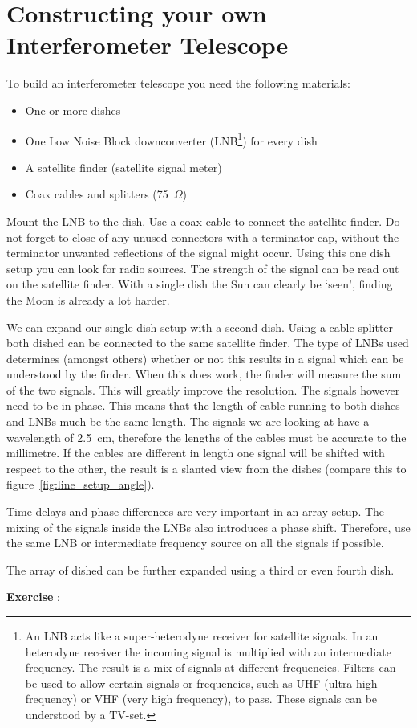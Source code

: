 \section{Constructing your own Interferometer Telescope}
To build an interferometer telescope you need the following materials:
\begin{itemize}
\item One or more dishes
\item One Low Noise Block downconverter (LNB\footnote{An LNB acts like a super-heterodyne receiver for satellite signals. In an heterodyne receiver the incoming signal is multiplied with an intermediate frequency. The result is a mix of signals at different frequencies. Filters can be used to allow certain signals or frequencies, such as UHF (ultra high frequency) or VHF (very high frequency), to pass. These signals can be understood by a TV-set. }) for every dish
\item A satellite finder (satellite signal meter)
\item Coax cables and splitters (75~$\Omega$)
\end{itemize}

Mount the LNB to the dish. Use a coax cable to connect the satellite finder. Do not forget to close of any unused connectors with a terminator cap, without the terminator unwanted reflections of the signal might occur. Using this one dish setup you can look for radio sources. The strength of the signal can be read out on the satellite finder. With a single dish the Sun can clearly be `seen', finding the Moon is already a lot harder.

We can expand our single dish setup with a second dish. Using a cable splitter both dished can be connected to the same satellite finder. The type of LNBs used determines (amongst others) whether or not this results in a signal which can be understood by the finder. When this does work, the finder will measure the sum of the two signals. This will greatly improve the resolution. The signals however need to be in phase. This means that the length of cable running to both dishes and LNBs much be the same length. The signals we are looking at have a wavelength of 2.5~cm, therefore the lengths of the cables must be accurate to the millimetre. If the cables are different in length one signal will be shifted with respect to the other, the result is a slanted view from the dishes (compare this to figure~\ref{fig:line_setup_angle}).

Time delays and phase differences are very important in an array setup. The mixing of the signals inside the LNBs also introduces a phase shift. Therefore, use the same LNB or intermediate frequency source on all the signals if possible. 

The array of dished can be further expanded using a third or even fourth dish. 





\begin{shaded}
\textbf{Exercise \theExercise {}} : \end{shaded}

\footnotemark
\footnotetext{}
